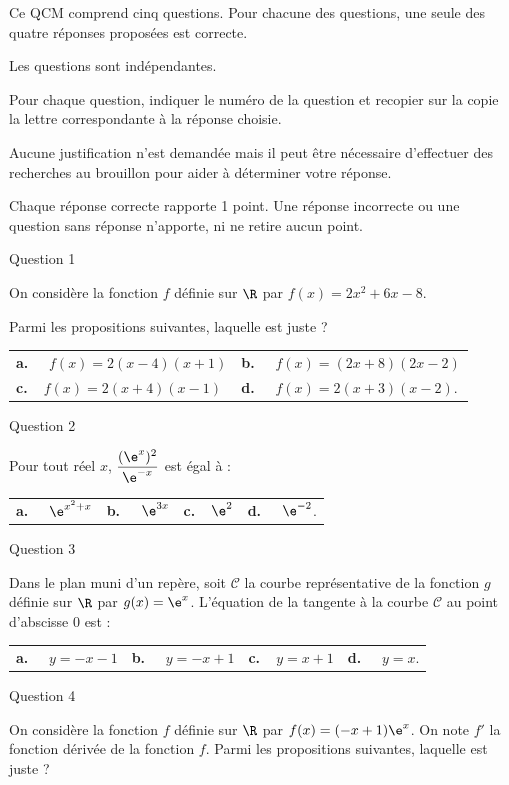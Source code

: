 \medskip

Ce QCM comprend cinq questions.
 Pour chacune des questions, une seule des quatre
réponses proposées est correcte. 

Les questions sont indépendantes.

Pour chaque question, indiquer le numéro de la question et recopier sur la copie la lettre
correspondante à la réponse choisie.

Aucune justification n’est demandée mais il peut être nécessaire d’effectuer des recherches
au brouillon pour aider à déterminer votre réponse.

Chaque réponse correcte rapporte 1 point. Une réponse incorrecte ou une question sans
réponse n’apporte, ni ne retire aucun point.

\medskip
Question 1
\medskip 


On considère la fonction $f$ définie sur $\R$ par $f(x)=2x^2 +6x-8$.

 Parmi les propositions suivantes, laquelle est juste ?
 
 \begin{tabularx}{\linewidth}{*{2}{X}}
\textbf{a.~~} $f(x)= 2( x - 4)(x +1)$ &\textbf{b.~~} $f(x)= (2x+8)(2x-2) $\\
\textbf{c.~~}$f(x)= 2(x+4)(x-1) $& \textbf{d.~~} $ f(x)= 2(x+3)(x-2)$.
\end{tabularx}

\medskip
Question 2
\medskip 

Pour tout réel $x$, $\dfrac{(\e^x)^2}{\e^{-x}}$ est égal à :

\begin{tabularx}{\linewidth}{*{4}{X}}
\textbf{a.~~} $\e^{x^2+x}$ &\textbf{b.~~} $\e^{3x} $&\textbf{c.~~}$\e^2 $& \textbf{d.~~} $\e^{-2} $.
\end{tabularx}

 \medskip
Question 3
 \medskip 

 Dans le plan muni d’un repère, soit  $\mathcal{C}$ la courbe représentative de la fonction $g$ définie sur $\R$
 par $g(x)=\e^x $. L’équation de la tangente à la courbe $\mathcal{C}$ au point d’abscisse 0 est :
 
 \begin{tabularx}{\linewidth}{*{4}{X}}
\textbf{a.~~} $y=-x-1 $ &\textbf{b.~~} $y=-x+1 $&\textbf{c.~~}$ y=x+1$& \textbf{d.~~} $ y=x$.
\end{tabularx}

 \medskip
 Question 4
 \medskip 

On considère la fonction $f$ définie sur $\R$ par $f(x) = (-x + 1)\e^x$.
On note $f'$ la fonction dérivée de la fonction $f$. Parmi les propositions suivantes, laquelle est
juste ?

